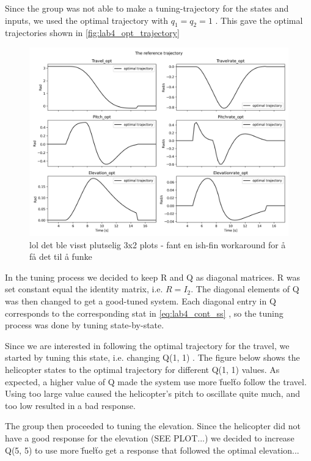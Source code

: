 \documentclass[../main.tex]{subfiles}
\begin{document}
Since the group was not able to make a tuning-trajectory for the states and inputs, we used the optimal trajectory with $q_1 = q_2 = 1$ . This gave the optimal trajectories shown in \cref{fig:lab4_opt_trajectory}

\begin{figure}[h]
	\centering
	\includegraphics[width=\linewidth]{figures/LAB4_reference_trajectory.png}
	\caption{lol det ble visst plutselig 3x2 plots - fant en ish-fin workaround for å få det til å funke}
\end{figure}

In the tuning process we decided to keep R and Q as diagonal matrices. R was set constant equal the identity matrix, i.e. $R = I_2$. The diagonal elements of Q was then changed to get a good-tuned system. Each diagonal entry in Q corresponds to the corresponding stat in \cref{eq:lab4_cont_ss} , so the tuning process was done by tuning state-by-state. 

Since we are interested in following the optimal trajectory for the travel, we started by tuning this state, i.e. changing Q(1, 1) . The figure below shows the helicopter states to the optimal trajectory for different Q(1, 1) values. As expected, a higher value of Q made the system use more \"fuel\" to follow the travel. Using too large value caused the helicopter's pitch to oscillate quite much, and too low resulted in a bad response.

The group then proceeded to tuning the elevation. Since the helicopter did not have a good response for the elevation (SEE PLOT...) we decided to increase Q(5, 5) to use more \"fuel\" to get a response that followed the optimal elevation...
\end{document}
